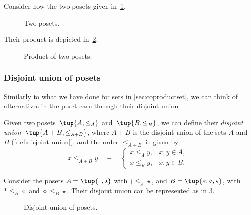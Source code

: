 \begin{example}
Consider now the two posets given in~\cref{fig:composing_posets_1}.
\begin{figure}[h!]
\begin{center}
\end{center}
\caption{Two posets. \label{fig:composing_posets_1}}
\end{figure}
Their product is depicted in~\cref{fig:composing_posets_2}.
\begin{figure}[h!]
\begin{center}
\end{center}
\caption{Product of two posets. \label{fig:composing_posets_2}}
\end{figure}
\end{example}

\subsubsection{Disjoint union of posets}

Similarly to what we have done for sets in \cref{sec:coproductset}, we can think of alternatives in the poset case through their disjoint union.

\begin{definition}
Given two posets~$\tup{A, \leq_A} $ and~$\tup{B, \leq_B}$, we can define their \emph{disjoint union}~$\tup{ A + B, \leq_{A + B}}$, where $A + B$
is the disjoint union of the sets $A$ and $B$ (\cref{def:disjoint-union}), and the
order $\leq_{A + B}$ is given by:
\begin{equation}
    x \leq_{A + B} y \quad\equiv\quad
    \begin{cases}
        x \leq_A y, & x,y \in A, \\
        x \leq_B y, & x,y \in B.
    \end{cases}
\end{equation}
\end{definition}


\begin{example}
Consider the posets $A=\tup{\dagger, \star}$ with $\dagger \leq_A \star$, and $B=\tup{\ast,\diamond,\star}$, with $\ast \leq_B \diamond$ and $\diamond \leq_B \star$. Their disjoint union can be represented as in \cref{fig:poset-coproduct}.

\begin{figure}[h!]
    \centering
    \caption{Disjoint union of posets. \label{fig:poset-coproduct}}
\end{figure}
\end{example}
